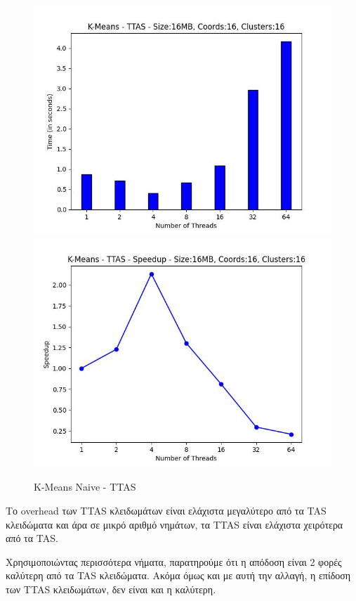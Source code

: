 \documentclass[../final_report.tex]{subfiles}
\begin{document}
\begin{figure}[H]
    \centering
        \includegraphics[scale=0.48]{outFilesAffinityMouliko/plots/kmeans_locks_ttas.jpg}
        \includegraphics[scale=0.48]{outFilesAffinityMouliko/plots/kmeans_locks_ttas_speedup.jpg}
    \caption{K-Means Naive - TTAS}
    \label{fig:K-Means Naive - TTAS}
\end{figure}

Το overhead των TTAS κλειδωμάτων είναι ελάχιστα μεγαλύτερο από τα TAS κλειδώματα και άρα σε 
μικρό αριθμό νημάτων, τα TTAS είναι ελάχιστα χειρότερα από τα TAS.

Χρησιμοποιώντας περισσότερα νήματα, παρατηρούμε ότι η απόδοση είναι 2 φορές καλύτερη από τα 
TAS κλειδώματα. Ακόμα όμως και με αυτή την αλλαγή, η επίδοση των TTAS κλειδωμάτων, δεν είναι και η
καλύτερη. 
\end{document}
